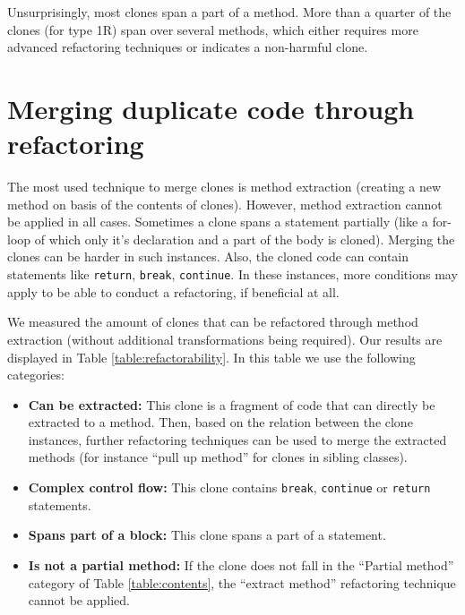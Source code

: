 Unsurprisingly, most clones span a part of a method. More than a quarter of the clones (for type 1R) span over several methods, which either requires more advanced refactoring techniques or indicates a non-harmful clone.

\section{Merging duplicate code through refactoring} \label{sec:refactorability}
The most used technique to merge clones is method extraction (creating a new method on basis of the contents of clones). However, method extraction cannot be applied in all cases. Sometimes a clone spans a statement partially (like a for-loop of which only it's declaration and a part of the body is cloned). Merging the clones can be harder in such instances. Also, the cloned code can contain statements like \texttt{return}, \texttt{break}, \texttt{continue}. In these instances, more conditions may apply to be able to conduct a refactoring, if beneficial at all.

We measured the amount of clones that can be refactored through method extraction (without additional transformations being required). Our results are displayed in Table \ref{table:refactorability}. In this table we use the following categories:
\begin{itemize}
    \item \textbf{Can be extracted:} This clone is a fragment of code that can directly be extracted to a method. Then, based on the relation between the clone instances, further refactoring techniques can be used to merge the extracted methods (for instance ``pull up method'' for clones in sibling classes).
    \item \textbf{Complex control flow:} This clone contains \texttt{break}, \texttt{continue} or \texttt{return} statements.
    \item \textbf{Spans part of a block:} This clone spans a part of a statement.
    \item \textbf{Is not a partial method:} If the clone does not fall in the ``Partial method'' category of Table \ref{table:contents}, the ``extract method'' refactoring technique cannot be applied.
\end{itemize}

